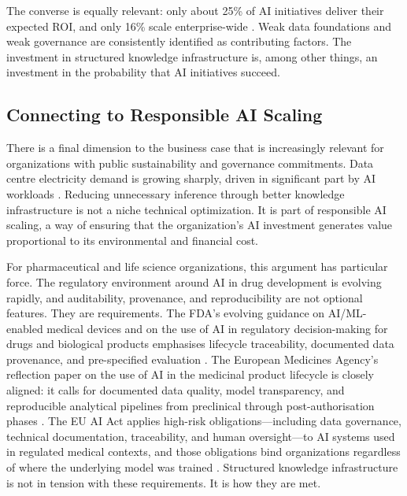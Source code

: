 \documentclass[man,12pt,donotrepeattitle]{apa7}
\begin{document}
The converse is equally relevant: only about 25\% of AI initiatives deliver
their expected ROI, and only 16\% scale enterprise-wide \parencite{ibm2025}.
Weak data foundations and weak governance are consistently identified as
contributing factors. The investment in structured knowledge infrastructure
is, among other things, an investment in the probability that AI initiatives
succeed.

\subsection{Connecting to Responsible AI Scaling}

There is a final dimension to the business case that is increasingly
relevant for organizations with public sustainability and governance
commitments. Data centre electricity demand is growing sharply, driven in
significant part by AI workloads \parencite{noffsinger2025}. Reducing
unnecessary inference through better knowledge infrastructure is not a niche
technical optimization. It is part of responsible AI scaling, a way of
ensuring that the organization's AI investment generates value proportional
to its environmental and financial cost.

For pharmaceutical and life science organizations, this argument has
particular force. The regulatory environment around AI in drug development
is evolving rapidly, and auditability, provenance, and reproducibility are
not optional features. They are requirements. The FDA's evolving guidance on
AI/ML-enabled medical devices and on the use of AI in regulatory
decision-making for drugs and biological products emphasises lifecycle
traceability, documented data provenance, and pre-specified evaluation
\parencite{fda2025,fda2024}. The European Medicines Agency's reflection
paper on the use of AI in the medicinal product lifecycle is closely aligned:
it calls for documented data quality, model transparency, and reproducible
analytical pipelines from preclinical through post-authorisation phases
\parencite{ema2024}. The EU AI Act applies high-risk obligations---including
data governance, technical documentation, traceability, and human
oversight---to AI systems used in regulated medical contexts, and those
obligations bind organizations regardless of where the underlying model was
trained \parencite{euaiact2024}. Structured knowledge infrastructure is not
in tension with these requirements. It is how they are met.

\end{document}

